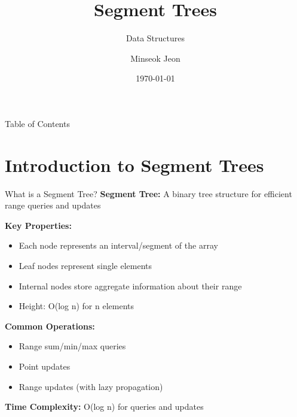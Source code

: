 \documentclass[aspectratio=169]{beamer}
\title{Segment Trees}
\subtitle{Data Structures}
\author{Minseok Jeon}
\institute{DGIST}
\date{\today}
\begin{document}
\begin{frame}
  \titlepage
\end{frame}

\begin{frame}{Table of Contents}
  \tableofcontents
\end{frame}

\section{Introduction to Segment Trees}

\begin{frame}{What is a Segment Tree?}
  \textbf{Segment Tree:} A binary tree structure for efficient range queries and updates

  \vspace{0.5cm}
  \textbf{Key Properties:}
  \begin{itemize}
    \item Each node represents an interval/segment of the array
    \item Leaf nodes represent single elements
    \item Internal nodes store aggregate information about their range
    \item Height: O(log n) for n elements
  \end{itemize}

  \vspace{0.5cm}
  \textbf{Common Operations:}
  \begin{itemize}
    \item Range sum/min/max queries
    \item Point updates
    \item Range updates (with lazy propagation)
  \end{itemize}

  \vspace{0.3cm}
  \textbf{Time Complexity:} O(log n) for queries and updates
\end{frame}
\end{document}
